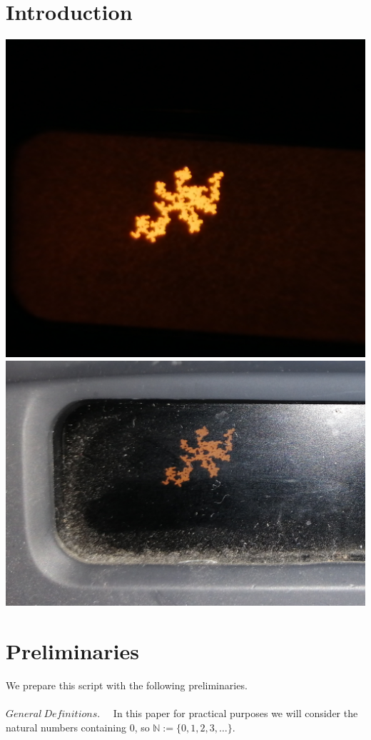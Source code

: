 \documentclass[12pt,a4paper]{scrartcl}
\numberwithin{equation}{subsection}
\numberwithin{equation}{section}
\theoremstyle{definition}
\begin{document}
\section{Introduction}
\includegraphics[scale=0.04]{display.jpg} 
\includegraphics[scale=0.091]{display2.jpg}

\newpage


\section{Preliminaries} \label{prelim}

We prepare this script with the following preliminaries. \\
\\
\noindent $\boldsymbol{\mathit{General\ Definitions}}.\quad$ In this paper for practical purposes we will consider the natural numbers containing 0, so $\mathbb{N} := \{0, 1, 2, 3, \dots\}$. 
\\
\end{document}
